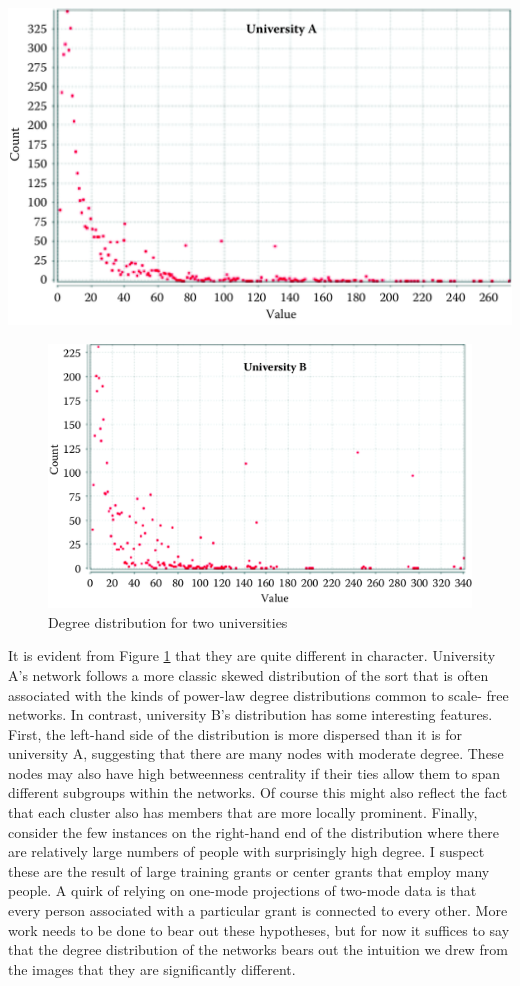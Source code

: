 \documentclass[]{krantz}
\begin{document}
\begin{center}\includegraphics[width=0.7\linewidth]{ChapterNetworks/figures/fig8-7a} \end{center}\begin{figure}

{\centering \includegraphics[width=0.7\linewidth]{ChapterNetworks/figures/fig8-7b} 

}

\caption{Degree distribution for two universities}\label{fig:fig8-7a}
\end{figure}

It is evident from Figure \ref{fig:fig8-7a} that they are quite
different in character. University A's network follows a more classic
skewed distribution of the sort that is often associated with the kinds
of power-law degree distributions common to scale- free networks. In
contrast, university B's distribution has some interesting features.
First, the left-hand side of the distribution is more dispersed than it
is for university A, suggesting that there are many nodes with moderate
degree. These nodes may also have high betweenness centrality if their
ties allow them to span different subgroups within the networks. Of
course this might also reflect the fact that each cluster also has
members that are more locally prominent. Finally, consider the few
instances on the right-hand end of the distribution where there are
relatively large numbers of people with surprisingly high degree. I
suspect these are the result of large training grants or center grants
that employ many people. A quirk of relying on one-mode projections of
two-mode data is that every person associated with a particular grant is
connected to every other. More work needs to be done to bear out these
hypotheses, but for now it suffices to say that the degree distribution
of the networks bears out the intuition we drew from the images that
they are significantly different.
\end{document}
